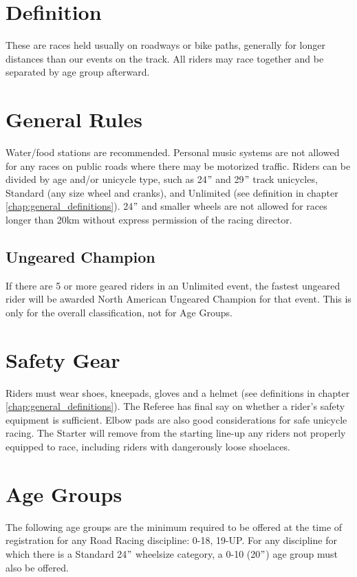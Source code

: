 
\section{Definition} %
These are races held usually on roadways or bike paths, generally for longer distances than our events on the track.
All riders may race together and be separated by age group afterward.

\section{General Rules}
Water/food stations are recommended.
Personal music systems are not allowed for any races on public roads where there may be motorized traffic.
Riders can be divided by age and/or unicycle type, such as 24$"$ and 29$"$ track unicycles, Standard (any size wheel and cranks), and Unlimited (see definition in chapter \ref{chap:general_definitions}).
24$"$ and smaller wheels are not allowed for races longer than 20km without express permission of the racing director.

\subsection{Ungeared Champion}
If there are 5 or more geared riders in an Unlimited event, the fastest ungeared rider will be awarded North American Ungeared Champion for that event.
This is only for the overall classification, not for Age Groups.

\section{Safety Gear}
Riders must wear shoes, kneepads, gloves and a helmet (see definitions in chapter \ref{chap:general_definitions}).
The Referee has final say on whether a rider's safety equipment is sufficient.
Elbow pads are also good considerations for safe unicycle racing.
The Starter will remove from the starting line-up any riders not properly equipped to race, including riders with dangerously loose shoelaces.

\section{Age Groups}
The following age groups are the minimum required to be offered at the time of registration for any Road Racing discipline: 0-18, 19-UP.
For any discipline for which there is a Standard 24$"$ wheelsize category,  a 0-10 (20$"$) age group must also be offered.

